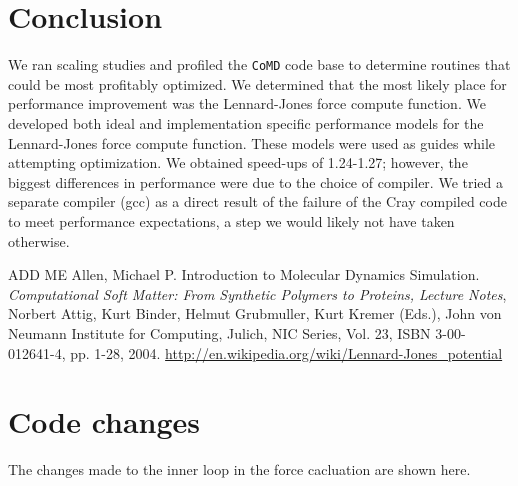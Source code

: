 \documentclass[12pt]{article}
\begin{document}

\section{Conclusion}
We ran scaling studies and profiled the \texttt{CoMD} code base to
determine routines that could be most profitably optimized. We
determined that the most likely place for performance improvement was
the Lennard-Jones force compute function. We developed both ideal and
implementation specific performance models for the Lennard-Jones force
compute function. These models were used as guides while attempting
optimization. We obtained speed-ups of 1.24-1.27; however, the biggest
differences in performance were due to the choice of compiler. We
tried a separate compiler (gcc) as a direct result of the failure of
the Cray compiled code to meet performance expectations, a step we
would likely not have taken otherwise.
\\


\begin{thebibliography}{}
     ADD ME
     Allen, Michael P. Introduction to Molecular Dynamics Simulation. 
      {\it Computational Soft Matter: From Synthetic Polymers to Proteins, Lecture Notes}, 
      Norbert Attig, Kurt Binder, Helmut Grubmuller, Kurt Kremer (Eds.),
      John von Neumann Institute for Computing, Julich,
      NIC Series, Vol. 23, ISBN 3-00-012641-4, pp. 1-28, 2004.
       \url{http://en.wikipedia.org/wiki/Lennard-Jones_potential}
\end{thebibliography}

\appendix
\section{Code changes}
\label{apd:code-changes}
The changes made to the inner loop in the force cacluation are shown
here.
\end{document}
